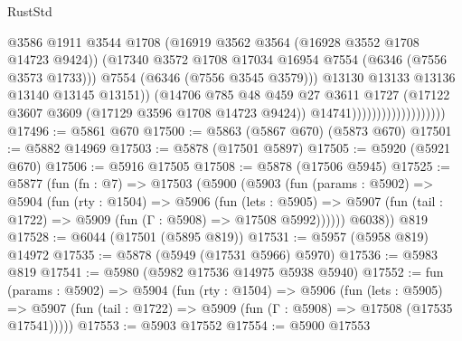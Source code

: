 \begin{lexlean}{RustStd}
\begin{coremodule}
                                              @3586
                                              @1911
                                              @3544
                                              @1708
                                              (@16919 @3562 @3564 (@16928 @3552 @1708 @14723 @9424))
                                              (@17340
                                                @3572
                                                @1708
                                                @17034
                                                @16954
                                                @7554
                                                (@6346 (@7556 @3573 @1733)))
                                              @7554
                                              (@6346 (@7556 @3545 @3579)))
                                            @13130
                                            @13133
                                            @13136
                                            @13140
                                            @13145
                                            @13151))
                                        (@14706
                                          @785
                                          @48
                                          @459
                                          @27
                                          @3611
                                          @1727
                                          (@17122 @3607 @3609 (@17129 @3596 @1708 @14723 @9424))
                                          @14741)))))))))))))))))))
@17496 := @5861 @670
@17500 := @5863 (@5867 @670) (@5873 @670)
@17501 := @5882 @14969
@17503 := @5878 (@17501 @5897)
@17505 := @5920 (@5921 @670)
@17506 := @5916 @17505
@17508 := @5878 (@17506 @5945)
@17525 := @5877
    (fun (fn : @7) =>
    @17503
      (@5900
        (@5903
          (fun (params : @5902) =>
          @5904
            (fun (rty : @1504) =>
            @5906
              (fun (lets : @5905) =>
              @5907 (fun (tail : @1722) => @5909 (fun (Γ : @5908) => @17508 @5992))))))
        @6038))
    @819
@17528 := @6044 (@17501 (@5895 @819))
@17531 := @5957 (@5958 @819) @14972
@17535 := @5878 (@5949 (@17531 @5966) @5970)
@17536 := @5983 @819
@17541 := @5980 (@5982 @17536 @14975 @5938 @5940)
@17552 := fun (params : @5902) =>
  @5904
    (fun (rty : @1504) =>
    @5906
      (fun (lets : @5905) =>
      @5907 (fun (tail : @1722) => @5909 (fun (Γ : @5908) => @17508 (@17535 @17541)))))
@17553 := @5903 @17552
@17554 := @5900 @17553

\end{coremodule}
\end{lexlean}
